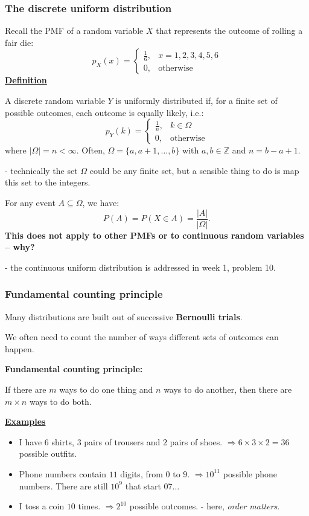 \documentclass[t,8pt]{beamer}
\begin{document}
\begin{frame}
	\frametitle{The discrete uniform distribution}
	Recall the PMF of a random variable $X$ that represents the outcome of rolling a fair die:
	$$
	p_X(x) = \left\{\begin{array}{lr}
		\frac 16, & x=1,2,3,4,5,6\\
		0, & \text{otherwise}
	\end{array}\right.
	$$
	{\bf\underline{Definition}} \par
	A discrete random variable $Y$ is uniformly distributed if, for a finite set of possible outcomes, each outcome is equally likely, i.e.:
	$$
	p_Y(k) = \left\{\begin{array}{lr}
		\frac 1n, & k\in\Omega\\
		0, & \text{otherwise}
	\end{array}\right.
	$$
	where $|\Omega|=n<\infty$. Often, $\Omega=\{a,a+1,\dots,b\}$ with $a,b\in\mathbb Z$ and $n=b-a+1$. \par
	{\small\color{NavyBlue} - technically the set $\Omega$ could be any finite set, but a sensible thing to do is map this set to the integers.} \par
	For any event $A\subseteq\Omega$, we have:
	$$P(A)=P(X\in A)=\frac{|A|}{|\Omega|}.$$
	{\bf This does not apply to other PMFs or to continuous random variables – why?} \par
	{\small\color{NavyBlue} - the continuous uniform distribution is addressed in week 1, problem 10.}
\end{frame}

\begin{frame}
	\frametitle{Fundamental counting principle}
	Many distributions are built out of successive {\bf Bernoulli trials}. \par
	We often need to count the number of ways different sets of outcomes can happen. \par
	{\bf Fundamental counting principle:} \par
	If there are $m$ ways to do one thing and $n$ ways to do another, then there are $m\times n$ ways to do both. \par
	{\bf\underline{Examples}}
	\begin{itemize}
		\item I have $6$ shirts, $3$ pairs of trousers and $2$ pairs of shoes.  
		$\Rightarrow 6\times 3\times 2=36$ possible outfits.
		\item Phone numbers contain $11$ digits, from $0$ to $9$.  
		$\Rightarrow 10^{11}$ possible phone numbers.  
		There are still $10^9$ that start $07\dots$
		\item I toss a coin $10$ times.  
		$\Rightarrow 2^{10}$ possible outcomes.  
		{\small\color{NavyBlue} - here, {\it order matters}.}
	\end{itemize}
\end{frame}
\end{document}
